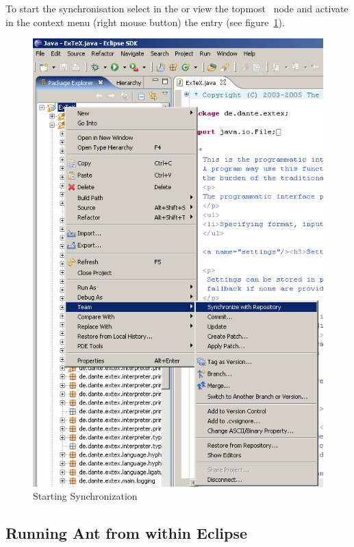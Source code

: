 To start the synchronisation select in the  or
 view the topmost \ExTeX\ node and activate in the
context menu (right mouse button) the entry  (see figure~\ref{fig:eclipse-team}).
\begin{figure}[htp]
  \centering
  \includegraphics[scale=.4]{image/eclipse/team}
  \caption{Starting Synchronization}\label{fig:eclipse-team}
\end{figure}



\INCOMPLETE



\subsection{Running Ant from within Eclipse}\label{sec:eclipse.ant}

